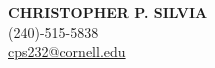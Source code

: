 \documentclass[12pt]{res}
\begin{document}
\begin{centering}
{\bf CHRISTOPHER P. SILVIA}\\
(240)-515-5838\\
\href{mailto:cps232@cornell.edu}{cps232@cornell.edu}\\
\end{centering}

\vspace{-12pt}

\address{\bf Present Address \\608 East Buffalo St.\\Ithaca, NY 14850}
\address{\bf Permanant Address \\ 7801 Leesburg Drive \\ Bethesda MD, 20817}
\end{document}
